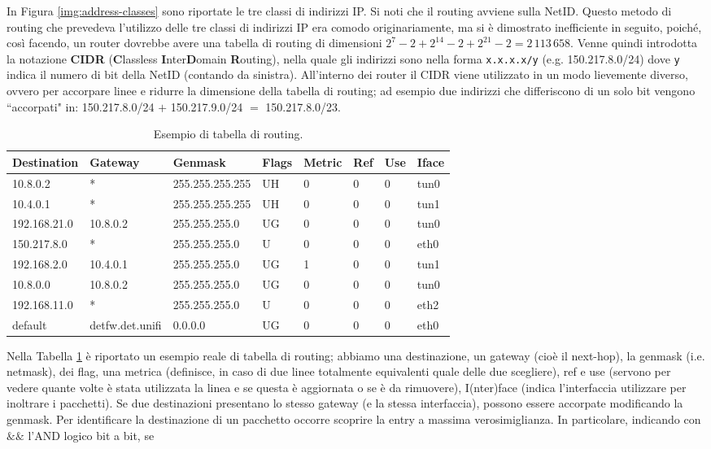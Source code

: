 In Figura \ref{img:address-classes} sono riportate le tre classi di indirizzi IP. Si noti che il routing avviene sulla NetID. Questo metodo di routing che prevedeva l'utilizzo delle tre classi di indirizzi IP era comodo originariamente, ma si è dimostrato inefficiente in seguito, poiché, così facendo, un router dovrebbe avere una tabella di routing di dimensioni $2^7-2+2^{14}-2+2^{21}-2 = 2\,113\,658$. Venne quindi introdotta la notazione \textbf{CIDR} (\textbf{C}lassless \textbf{I}nter\textbf{D}omain \textbf{R}outing), nella quale gli indirizzi sono nella forma \texttt{x.x.x.x/y} (e.g. 150.217.8.0/24) dove \texttt{y} indica il numero di bit della NetID (contando da sinistra). All'interno dei router il CIDR viene utilizzato in un modo lievemente diverso, ovvero per accorpare linee e ridurre la dimensione della tabella di routing; ad esempio due indirizzi che differiscono di un solo bit vengono \textquotedblleft accorpati" in: 150.217.8.0/24 $+$ 150.217.9.0/24 $=$ 150.217.8.0/23.
\begin{table}[htbp]
	\centering
	\begin{tabular}{llllllll}
		\hline
		\textbf{Destination} & \textbf{Gateway} & \textbf{Genmask} & \textbf{Flags} & \textbf{Metric} & \textbf{Ref} & \textbf{Use} & \textbf{Iface} \\ \hline
		10.8.0.2 & * & 255.255.255.255 & UH & 0 & 0 & 0 & tun0 \\%
		10.4.0.1 & * & 255.255.255.255 & UH & 0 & 0 & 0 & tun1 \\%
		192.168.21.0 & 10.8.0.2 & 255.255.255.0 & UG & 0 & 0 & 0 & tun0 \\%
		150.217.8.0 & * & 255.255.255.0 & U & 0 & 0 & 0 & eth0 \\%
		192.168.2.0 & 10.4.0.1 & 255.255.255.0 & UG & 1 & 0 & 0 & tun1 \\%
		10.8.0.0 & 10.8.0.2 & 255.255.255.0 & UG & 0 & 0 & 0 & tun0 \\%
		192.168.11.0 & * & 255.255.255.0 & U & 0 & 0 & 0 & eth2 \\%
		default & detfw.det.unifi & 0.0.0.0 & UG & 0 & 0 & 0 & eth0 \\%
	\end{tabular}
	\caption{Esempio di tabella di routing.}
	\label{tab:routing-table-example}
\end{table}
Nella Tabella \ref{tab:routing-table-example} è riportato un esempio reale di tabella di routing; abbiamo una destinazione, un gateway (cioè il next-hop), la genmask (i.e. netmask), dei flag, una metrica (definisce, in caso di due linee totalmente equivalenti quale delle due scegliere), ref e use (servono per vedere quante volte è stata utilizzata la linea e se questa è aggiornata o se è da rimuovere), I(nter)face (indica l'interfaccia utilizzare per inoltrare i pacchetti). Se due destinazioni presentano lo stesso gateway (e la stessa interfaccia), possono essere accorpate modificando la genmask. Per identificare la destinazione di un pacchetto occorre scoprire la entry a massima verosimiglianza. In particolare, indicando con $\&\&$ l'AND logico bit a bit, se

